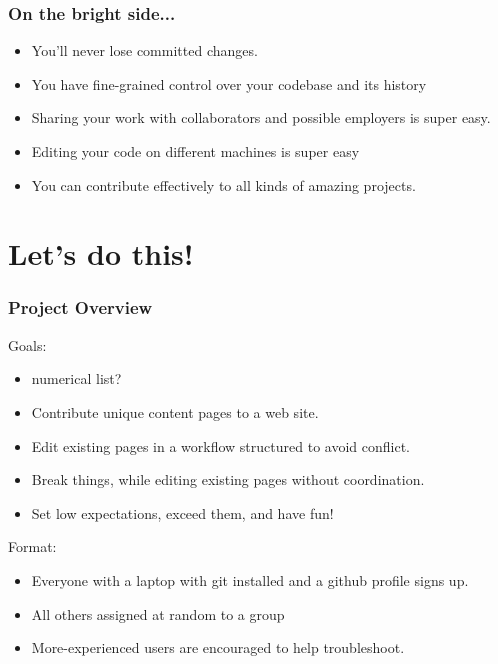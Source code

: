 \documentclass[unknownkeysallowed]{beamer}
\begin{document}
\begin{frame}
    \frametitle{On the bright side...}
    \begin{itemize}
        \item{You'll never lose committed changes.}
        \item{You have fine-grained control over your codebase and its history}
        \item{Sharing your work with collaborators and possible employers is super easy.}
        \item{Editing your code on different machines is super easy}
        \item{You can contribute effectively to all kinds of amazing projects.}
    \end{itemize}
    \vspace{1cm} %
\end{frame}

\section{Let's do this!}
\begin{frame}
    \frametitle{Project Overview}
    Goals:
    \begin{itemize}
        \item{numerical list?}
        \item{Contribute unique content pages to a web site.}
        \item{Edit existing pages in a workflow structured to avoid conflict.}
        \item{Break things, while editing existing pages without coordination.}
        \item{Set low expectations, exceed them, and have fun!}
    \end{itemize}
    Format:
    \begin{itemize}
        \item{Everyone with a laptop with git installed and a github profile signs up.}
        \item{All others assigned at random to a group}
        \item{More-experienced users are encouraged to help troubleshoot.}
    \end{itemize}
    \vspace{1cm} %
\end{frame}
\end{document}
